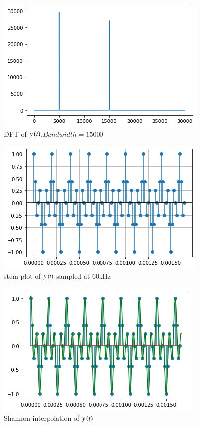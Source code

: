 \begin{figure}[!h]
 \centering
 \includegraphics[width=\columnwidth]{solutions/ec/2021/4/figs/four_y.png}
 \caption{DFT of $y\left(t\right)$.$Bandwidth=15000$}
 \label{ec/2021/4/3}
 \end{figure}
\begin{figure}[!h]
 \centering
 \includegraphics[width=\columnwidth]{solutions/ec/2021/4/figs/stem_y.png}
 \caption{stem plot of $y\left(t\right)$ sampled at 60kHz}
 \label{ec/2021/4/4}
 \end{figure}
\begin{figure}[!h]
 \centering
 \includegraphics[width=\columnwidth]{solutions/ec/2021/4/figs/interpolation.png}
 \caption{Shannon interpolation of $y\left(t\right)$}
 \label{ec/2021/4/5}
 \end{figure}



